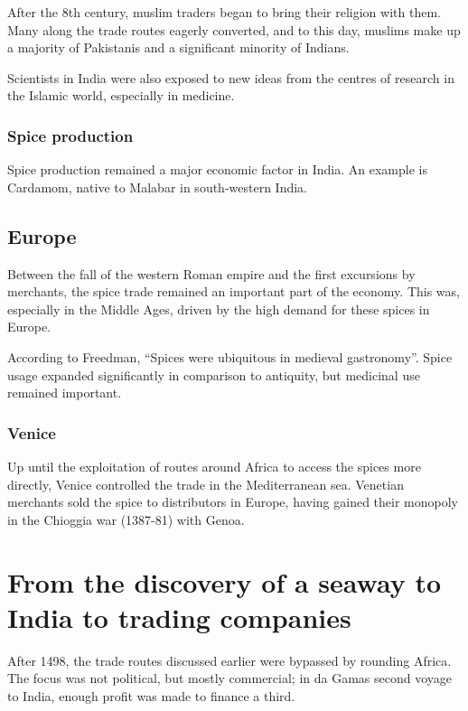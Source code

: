 \documentclass[11pt, a4paper, headings=standardclasses]{scrartcl}
\begin{document}
After the 8th century, muslim traders began to bring their religion with them.\autocite{SilkRoadIslam} Many along the trade routes eagerly converted, and to this day, muslims make up a majority of Pakistanis and a significant minority of Indians.\autocite{India} \label{Islam}

Scientists in India were also exposed to new ideas from the centres of research in the Islamic world, especially in medicine.\autocite{SilkRoadIslam}

\subsubsection{Spice production}

Spice production remained a major economic factor in India. An example is Cardamom, native to Malabar in south-western India.\autocite[71]{Rome}

\subsection{Europe}

Between the fall of the western Roman empire and the first excursions by merchants, the spice trade remained an important part of the economy.\autocite{Yale} This was, especially in the Middle Ages, driven by the high demand for these spices in Europe. 

According to Freedman, ``Spices were ubiquitous in medieval gastronomy''.\autocite[3]{MST} Spice usage expanded significantly in comparison to antiquity, but medicinal use remained important.\autocite{RIS}

\subsubsection{Venice}

Up until the exploitation of routes around Africa to access the spices more directly, Venice controlled the trade in the Mediterranean sea. Venetian merchants sold the spice to distributors in Europe, having gained their monopoly in the Chioggia war (1387-81) with Genoa.\autocite{SpiceTrade}

\section{From the discovery of a seaway to India to trading companies}

After 1498, the trade routes discussed earlier were bypassed by rounding Africa. The focus was not political, but mostly commercial; in da Gamas second voyage to India, enough profit was made to finance a third.\autocite[Section \textit{The second voyage}]{Vasco}
\end{document}
